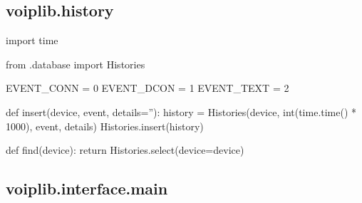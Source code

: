 \subsection{voiplib.history}
\begin{pythoncode}
import time

from .database import Histories


EVENT_CONN = 0
EVENT_DCON = 1
EVENT_TEXT = 2


def insert(device, event, details=''):
    history = Histories(device, int(time.time() * 1000), event, details)
    Histories.insert(history)


def find(device):
    return Histories.select(device=device)
\end{pythoncode}
\subsection{voiplib.interface.main}
